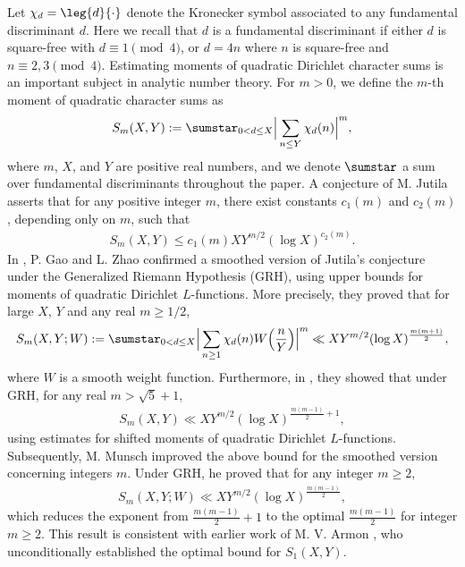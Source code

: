 \documentclass[twoside,leqno,10pt, A4]{amsart}
\begin{document}
Let $\chi_d=\leg {d}{\cdot}$ denote the Kronecker symbol associated to any fundamental discriminant $d$.  Here we recall that $d$ is a fundamental discriminant if either $d$ is square-free with $d \equiv 1 \pmod 4$, or $d=4n$ where $n$ is square-free and $n \equiv 2,3 \pmod 4$. Estimating moments of quadratic Dirichlet character sums is an important subject in analytic number theory. For $m>0$, we define the $m$-th moment of quadratic character sums as
\begin{align*}
 S_m(X,Y):= \sumstar_{0<d \leq X }\Big | \sum_{n \leq Y}\chi_d(n)\Big |^{m},
\end{align*}
 where $m$, $X$, and $Y$ are positive real numbers, and we denote $\sumstar$ a sum over fundamental discriminants throughout the paper. A conjecture of M. Jutila \cite{Jutila} asserts that for any positive integer $m$, there exist constants $c_1(m)$ and $c_2(m)$, depending only on $m$, such that
 \begin{align*}
 S_m(X,Y)\leq c_1(m)XY^{m/2}(\log X)^{c_2(m)}.
 \end{align*}
 In \cite{G&Zhao2024},  P. Gao and L. Zhao confirmed a smoothed version of Jutila's conjecture  under the Generalized Riemann Hypothesis (GRH), using upper bounds for moments of quadratic Dirichlet $L$-functions. More precisely, they proved that for large $X$, $Y$ and any real $m\geq 1/2$,
\begin{align*}
 S_m(X,Y;W):=\sumstar_{\substack{0<d \leq X }}\Big | \sum_{n \geq 1}\chi_{d}(n)W\Big(\frac{n}{Y}\Big)\Big |^{m} \ll XY^{m/2}(\log X)^{\frac {m(m+1)}{2}},
\end{align*}
where $W$ is a smooth weight function.  Furthermore,  in
 \cite[Theorem 1.3]{G&Zhao2024-3}, they showed  that under GRH, for any real $m>\sqrt{5}+1$,
 \begin{align*}
 S_m(X,Y)\ll XY^{m/2}(\log X)^{\frac{m(m-1)}{2}+1},
 \end{align*}
  using estimates for shifted moments of quadratic Dirichlet $L$-functions. Subsequently,  M. Munsch \cite{Mun} improved the above bound for the smoothed version concerning integers $m$.  Under GRH, he proved that for any  integer $m\geq2$,
   \begin{align*}
 S_m(X,Y;W)\ll XY^{m/2}(\log X)^{\frac{m(m-1)}{2}},
 \end{align*}
   which reduces the  exponent from $\frac {m(m-1)}{2}+1$ to the optimal $\frac {m(m-1)}{2}$ for integer $m \geq 2$. This result is consistent with earlier work of M. V. Armon \cite[Theorem 2]{Armon}, who unconditionally established the optimal bound  for $S_1(X,Y)$.
\bigskip
\end{document}
